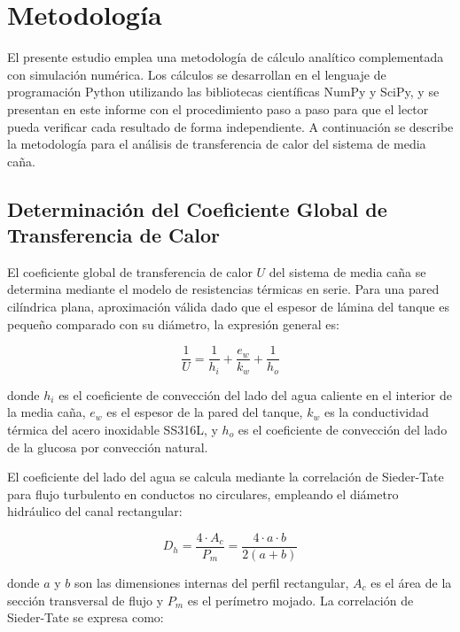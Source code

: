 \section{Metodolog\'ia}

El presente estudio emplea una metodolog\'ia de c\'alculo anal\'itico complementada con simulaci\'on num\'erica. Los c\'alculos se desarrollan en el lenguaje de programaci\'on Python utilizando las bibliotecas cient\'ificas NumPy y SciPy, y se presentan en este informe con el procedimiento paso a paso para que el lector pueda verificar cada resultado de forma independiente. A continuaci\'on se describe la metodolog\'ia para el an\'alisis de transferencia de calor del sistema de media ca\~na.

\subsection{Determinaci\'on del Coeficiente Global de Transferencia de Calor}
\label{sec:metodologia_U}

El coeficiente global de transferencia de calor $U$ del sistema de media ca\~na se determina mediante el modelo de resistencias t\'ermicas en serie. Para una pared cil\'indrica plana, aproximaci\'on v\'alida dado que el espesor de l\'amina del tanque es peque\~no comparado con su di\'ametro, la expresi\'on general es:

\begin{equation}
\frac{1}{U} = \frac{1}{h_i} + \frac{e_{w}}{k_{w}} + \frac{1}{h_o}
\label{eq:U_global}
\end{equation}

donde $h_i$ es el coeficiente de convecci\'on del lado del agua caliente en el interior de la media ca\~na, $e_{w}$ es el espesor de la pared del tanque, $k_{w}$ es la conductividad t\'ermica del acero inoxidable SS316L, y $h_o$ es el coeficiente de convecci\'on del lado de la glucosa por convecci\'on natural.

El coeficiente del lado del agua se calcula mediante la correlaci\'on de Sieder-Tate para flujo turbulento en conductos no circulares, empleando el di\'ametro hidr\'aulico del canal rectangular:

\begin{equation}
D_h = \frac{4 \cdot A_c}{P_m} = \frac{4 \cdot a \cdot b}{2(a+b)}
\label{eq:Dh}
\end{equation}

donde $a$ y $b$ son las dimensiones internas del perfil rectangular, $A_c$ es el \'area de la secci\'on transversal de flujo y $P_m$ es el per\'imetro mojado. La correlaci\'on de Sieder-Tate se expresa como:

